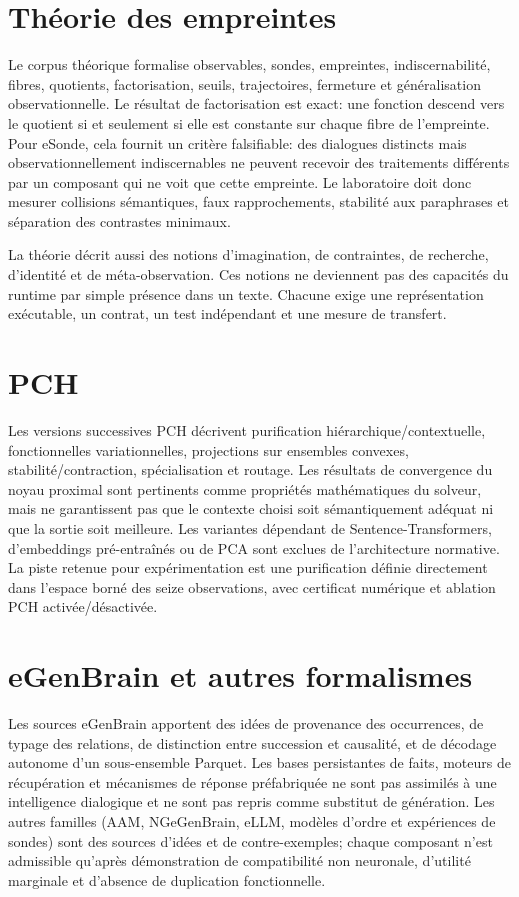 \documentclass[11pt,a4paper]{report}
\begin{document}
\section{Théorie des empreintes}
Le corpus théorique formalise observables, sondes, empreintes, indiscernabilité, fibres, quotients, factorisation, seuils, trajectoires, fermeture et généralisation observationnelle. Le résultat de factorisation est exact: une fonction descend vers le quotient si et seulement si elle est constante sur chaque fibre de l'empreinte. Pour eSonde, cela fournit un critère falsifiable: des dialogues distincts mais observationnellement indiscernables ne peuvent recevoir des traitements différents par un composant qui ne voit que cette empreinte. Le laboratoire doit donc mesurer collisions sémantiques, faux rapprochements, stabilité aux paraphrases et séparation des contrastes minimaux.

La théorie décrit aussi des notions d'imagination, de contraintes, de recherche, d'identité et de méta-observation. Ces notions ne deviennent pas des capacités du runtime par simple présence dans un texte. Chacune exige une représentation exécutable, un contrat, un test indépendant et une mesure de transfert.

\section{PCH}
Les versions successives PCH décrivent purification hiérarchique/contextuelle, fonctionnelles variationnelles, projections sur ensembles convexes, stabilité/contraction, spécialisation et routage. Les résultats de convergence du noyau proximal sont pertinents comme propriétés mathématiques du solveur, mais ne garantissent pas que le contexte choisi soit sémantiquement adéquat ni que la sortie soit meilleure. Les variantes dépendant de Sentence-Transformers, d'embeddings pré-entraînés ou de PCA sont exclues de l'architecture normative. La piste retenue pour expérimentation est une purification définie directement dans l'espace borné des seize observations, avec certificat numérique et ablation PCH activée/désactivée.

\section{eGenBrain et autres formalismes}
Les sources eGenBrain apportent des idées de provenance des occurrences, de typage des relations, de distinction entre succession et causalité, et de décodage autonome d'un sous-ensemble Parquet. Les bases persistantes de faits, moteurs de récupération et mécanismes de réponse préfabriquée ne sont pas assimilés à une intelligence dialogique et ne sont pas repris comme substitut de génération. Les autres familles (AAM, NGeGenBrain, eLLM, modèles d'ordre et expériences de sondes) sont des sources d'idées et de contre-exemples; chaque composant n'est admissible qu'après démonstration de compatibilité non neuronale, d'utilité marginale et d'absence de duplication fonctionnelle.
\end{document}
